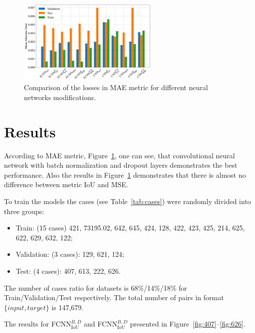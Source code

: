 \documentclass[aerospace,article,submit,moreauthors,pdftex]{Definitions/mdpi}
\begin{document}
\begin{figure}[H]
\includegraphics[width=0.6\textwidth]{Figures/losMAE.png}
\caption{Comparison of the losses in MAE metric for different neural networks modifications.\label{fig:losMAE}}
\end{figure} 

\section{Results \label{sec:results}}

According to MAE metric, Figure~\ref{fig:losMAE}, one can see, that convolutional neural network with batch normalization and dropout layers demonstrates the best performance. Also the results in  Figure~\ref{fig:losMAE} demonstrates that there is almost no difference between metric IoU and MSE.   

To train the models the cases (see Table~\ref{tab:cases}) were randomly divided into three groups: 
\begin{itemize}
    \item Train: (15 cases) 421, 73195.02, 642, 645, 424, 128, 422, 423, 425, 214, 625, 622, 629, 632, 122;
    \item Validation: (3 cases): 129, 621, 124;
    \item Test: (4 cases): 407, 613, 222, 626.
\end{itemize}

The number of cases ratio for datasets is 68\%/14\%/18\% for Train/Validation/Test respectively. The total number of pairs in format $\{input,target\}$ is 147,679.



The results for FCNN$_{\text{IoU}}^{B,D}$ and FCNN$_{\text{IoU}}^{B,D}$ presented in Figure~\ref{fig:407}--\ref{fig:626}.
\end{document}
